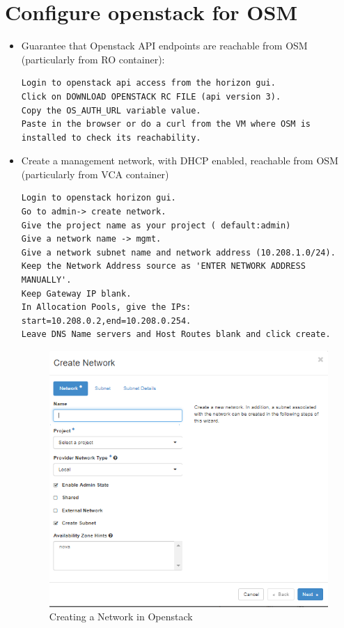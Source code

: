 \section{Configure openstack for OSM}
\begin{itemize}

\item Guarantee that Openstack API endpoints are reachable from OSM (particularly from RO container):
\begin{lstlisting}
Login to openstack api access from the horizon gui.
Click on DOWNLOAD OPENSTACK RC FILE (api version 3).
Copy the OS_AUTH_URL variable value.
Paste in the browser or do a curl from the VM where OSM is installed to check its reachability. 
\end{lstlisting}

\item Create a management network, with DHCP enabled, reachable from OSM (particularly from VCA container)
\begin{lstlisting}
Login to openstack horizon gui.
Go to admin-> create network.
Give the project name as your project ( default:admin)
Give a network name -> mgmt.
Give a network subnet name and network address (10.208.1.0/24). 
Keep the Network Address source as 'ENTER NETWORK ADDRESS MANUALLY'.
Keep Gateway IP blank.
In Allocation Pools, give the IPs:  start=10.208.0.2,end=10.208.0.254.
Leave DNS Name servers and Host Routes blank and click create.
\end{lstlisting}
\begin{figure}[h]
	\centering
	\includegraphics[width=0.5\linewidth]{figures/sh11}
	\caption{Creating a Network in Openstack}
\end{figure} 


\end{itemize}
